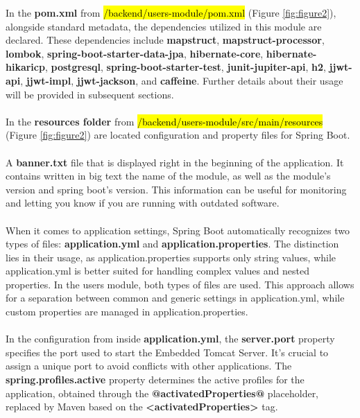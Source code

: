 \noindent In the \textbf{pom.xml} from \hl{/backend/users-module/pom.xml} (Figure \ref{fig:figure2}), alongside standard metadata, the dependencies utilized in this module are declared. These dependencies include \textbf{mapstruct}, \textbf{mapstruct-processor}, \textbf{lombok}, \textbf{spring-boot-starter-data-jpa}, \textbf{hibernate-core}, \textbf{hibernate-hikaricp}, \textbf{postgresql}, \textbf{spring-boot-starter-test}, \textbf{junit-jupiter-api}, \textbf{h2}, \textbf{jjwt-api}, \textbf{jjwt-impl}, \textbf{jjwt-jackson}, and \textbf{caffeine}. Further details about their usage will be provided in subsequent sections.
\\\\\newpage
\noindent In the \textbf{resources folder} from \hl{/backend/users-module/src/main/resources} (Figure \ref{fig:figure2}) are located configuration and property files for Spring Boot.
\\\\
\noindent A \textbf{banner.txt} file that is displayed right in the beginning of the application. It contains written in big text the name of the module, as well as the module's version and spring boot's version. This information can be useful for monitoring and letting you know if you are running with outdated software.
\\\\
\noindent When it comes to application settings, Spring Boot automatically recognizes two types of files: \textbf{application.yml} and \textbf{application.properties}. The distinction lies in their usage, as application.properties supports only string values, while application.yml is better suited for handling complex values and nested properties. In the users module, both types of files are used. This approach allows for a separation between common and generic settings in application.yml, while custom properties are managed in application.properties.
\\\\
\noindent In the configuration from inside \textbf{application.yml}, the \textbf{server.port} property specifies the port used to start the Embedded Tomcat Server. It's crucial to assign a unique port to avoid conflicts with other applications. The \textbf{spring.profiles.active} property determines the active profiles for the application, obtained through the \textbf{@activatedProperties@} placeholder, replaced by Maven based on the \textbf{<activatedProperties>} tag.
\\\\
